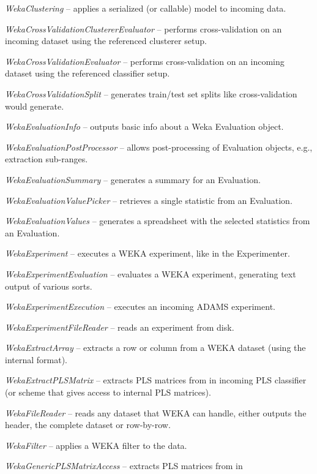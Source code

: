 \begin{tight_itemize}
	\item \textit{WekaClustering} -- applies a serialized (or callable) model
	to incoming data.
	\item \textit{WekaCrossValidationClustererEvaluator} -- performs cross-validation
	on an incoming dataset using the referenced clusterer setup.
	\item \textit{WekaCrossValidationEvaluator} -- performs cross-validation
	on an incoming dataset using the referenced classifier setup.
	\item \textit{WekaCrossValidationSplit} -- generates train/test set splits
	like cross-validation would generate.
	\item \textit{WekaEvaluationInfo} -- outputs basic info about a Weka
	Evaluation object.
	\item \textit{WekaEvaluationPostProcessor} -- allows post-processing
	of Evaluation objects, e.g., extraction sub-ranges.
	\item \textit{WekaEvaluationSummary} -- generates a summary for an
	Evaluation.
	\item \textit{WekaEvaluationValuePicker} -- retrieves a single statistic
	from an Evaluation.
	\item \textit{WekaEvaluationValues} -- generates a spreadsheet with the
	selected statistics from an Evaluation.
	\item \textit{WekaExperiment} -- executes a WEKA experiment, like in the 
	Experimenter.
	\item \textit{WekaExperimentEvaluation} -- evaluates a WEKA experiment,
	generating text output of various sorts.
	\item \textit{WekaExperimentExecution} -- executes an incoming ADAMS
	experiment.
	\item \textit{WekaExperimentFileReader} -- reads an experiment from disk.
	\item \textit{WekaExtractArray} -- extracts a row or column from a WEKA
	dataset (using the internal format).
	\item \textit{WekaExtractPLSMatrix} -- extracts PLS matrices from in
	incoming PLS classifier (or scheme that gives access to internal PLS matrices).
	\item \textit{WekaFileReader} -- reads any dataset that WEKA can handle,
	either outputs the header, the complete dataset or row-by-row.
	\item \textit{WekaFilter} -- applies a WEKA filter to the data.
	\item \textit{WekaGenericPLSMatrixAccess} -- extracts PLS matrices from in

\end{tight_itemize}
